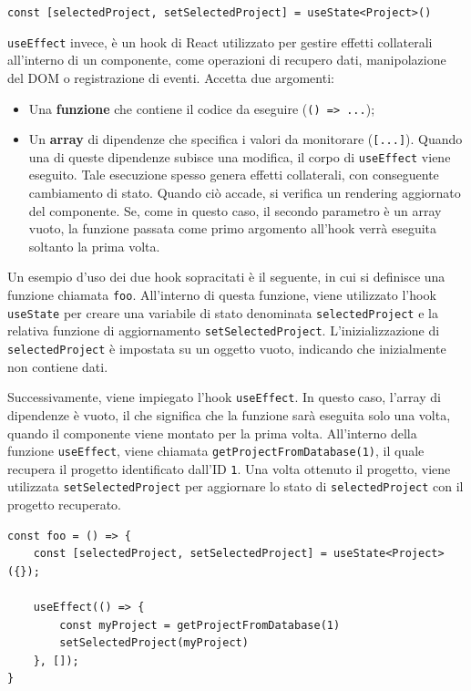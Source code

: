 \documentclass[target=bach,aauheader=,style=]{thud}
\begin{document}
\begin{center}
\texttt{const [selectedProject, setSelectedProject] = useState<Project>({})}
\end{center}

\noindent \texttt{useEffect} invece, è un hook di React utilizzato per gestire effetti collaterali all'interno di un componente, come operazioni di recupero dati, manipolazione del DOM o registrazione di eventi. Accetta due argomenti: 

\begin{itemize}
    \item Una \textbf{funzione} che contiene il codice da eseguire (\texttt{() => {...}});
    \item Un \textbf{array} di dipendenze che specifica i valori da monitorare (\texttt{[...]}). Quando una di queste dipendenze subisce una modifica, il corpo di \texttt{useEffect} viene eseguito. Tale esecuzione spesso genera effetti collaterali, con conseguente cambiamento di stato. Quando ciò accade, si verifica un rendering aggiornato del componente. Se, come in questo caso, il secondo parametro è un array vuoto, la funzione passata come primo argomento all'hook verrà eseguita soltanto la prima volta.
\end{itemize}

\noindent Un esempio d'uso dei due hook sopracitati è il seguente, in cui si definisce una funzione chiamata \texttt{foo}. All'interno di questa funzione, viene utilizzato l'hook \texttt{useState} per creare una variabile di stato denominata \texttt{selectedProject} e la relativa funzione di aggiornamento \texttt{setSelectedProject}. L'inizializzazione di \texttt{selectedProject} è impostata su un oggetto vuoto, indicando che inizialmente non contiene dati.

\noindent Successivamente, viene impiegato l'hook \texttt{useEffect}. In questo caso, l'array di dipendenze è vuoto, il che significa che la funzione sarà eseguita solo una volta, quando il componente viene montato per la prima volta. All'interno della funzione \texttt{useEffect}, viene chiamata \texttt{getProjectFromDatabase(1)}, il quale recupera il progetto identificato dall'ID \texttt{1}. Una volta ottenuto il progetto, viene utilizzata \texttt{setSelectedProject} per aggiornare lo stato di \texttt{selectedProject} con il progetto recuperato.

\begin{lstlisting}[caption=\texttt{useEffect} e \texttt{useState} per ottenere e salvare un progetto in uno stato locale]
const foo = () => {
    const [selectedProject, setSelectedProject] = useState<Project>({});

    useEffect(() => {
        const myProject = getProjectFromDatabase(1)
        setSelectedProject(myProject)
    }, []);
}
\end{lstlisting}
\end{document}
